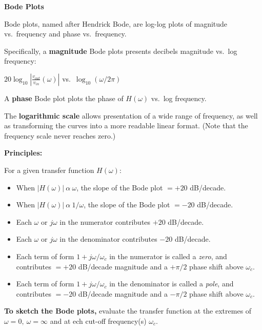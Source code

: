 \documentclass[10pt]{report}
\begin{document}
\setcounter{page}{1}
\setcounter{equation}{0}
\setcounter{figure}{0}
\begin{center}
\Large{\textbf{Bode Plots}}
\normalsize
\end{center}


Bode plots, named after Hendrick Bode, are log-log plots of magnitude vs.\ frequency and phase
vs.\ frequency. 

Specifically, a \textbf{magnitude} Bode plots presents
decibels magnitude vs.\ log frequency:

$20 \log_{10} |\frac{v_{out}}{v_{in}}(\omega)|$ vs.\
$\log_{10}(\omega / 2 \pi)$

A \textbf{phase} Bode plot plots the phase of $H(\omega)$ vs.\ log frequency.

The \textbf{logarithmic scale} allows presentation of a wide range of
frequency, as well as transforming the curves into a more readable
linear format. (Note that the frequency scale never reaches zero.)

\textbf{Principles:}

For a given transfer function $H(\omega)$:
\begin{itemize}
\item When $|H(\omega)|~\alpha~\omega$, the slope of the Bode plot $= +20$
dB/decade.
\item When $|H(\omega)|~\alpha~1/\omega$, the slope of the Bode plot $= -20$
dB/decade.

\item Each $\omega$ or $j\omega$ in the numerator contributes $+20$
dB/decade.
\item Each $\omega$ or $j\omega$ in the denominator contributes $-20$
dB/decade.

\item Each term of form $1 + j \omega / \omega_c$ in the numerator is called
a \textit{zero}, and contributes $= +20$
dB/decade magnitude and a $+\pi/2$ phase shift above $\omega_c$.

\item Each term of form $1 + j \omega / \omega_c$ in the denominator is called
a \textit{pole}, and contributes $= -20$
dB/decade magnitude and a $-\pi/2$ phase shift above $\omega_c$.
\end{itemize}

\textbf{To sketch the Bode plots,} evaluate the transfer function at
the extremes of $\omega=0,~\omega=\infty $ and at ech cut-off
frequency(s) $\omega_{c}$.
\end{document}
